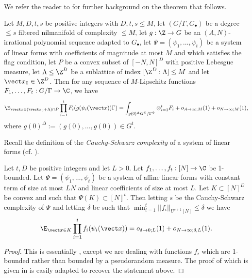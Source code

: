 We refer the reader to \cite{GT10} for further background on the theorem that follows. 

\begin{thm}\label{t:cl}
Let $M, D, t, s$ be positive integers with $D,t,s \leq M$, let $(G/\Gamma, G_\bullet)$ be a degree $\leq s$ filtered nilmanifold of complexity $\leq M$,  let $g: \Z \to G$ be an $(A,N)$-irrational polynomial sequence adapted to $G_\bullet$, let $\Psi = (\psi_1,\ldots, \psi_t)$ be a system of linear forms  with coefficients of magnitude at most $M$ and which satisfies the flag condition, let $P$ be a convex subset of $[-N,N]^D$ with positive Lebesgue measure, let $\Lambda \leq \Z^D$ be a sublattice of index $[\Z^D:\Lambda]\leq M$ and let $\vect x_0 \in \Z^D$. Then for any sequence of $M$-Lipschitz functions $F_1,\ldots,F_t: G/\Gamma \to \C$, we have 
\[\E_{\vect x \in (\vect x_0 + \Lambda )\cap P} \prod_{i=1}^t F_i(g(\psi_i(\vect x))\Gamma) =  \int_{g(0)^\Delta G^\Psi/\Gamma^\Psi}\otimes_{i=1}^t F_i + o_{A\to \infty;M}(1) + o_{N \to \infty;M}(1),\]
where $g(0)^\Delta:= (g(0),\ldots, g(0)) \in G^t$.
\end{thm}

Recall the definition of the \textit{Cauchy-Schwarz complexity} of a system of linear forms (cf. \cite[Definition 1.3.2]{T12}). 

\begin{thm}\label{t:gvN}
Let $t,D$ be positive integers and let $L>0$. Let $f_1, \ldots, f_t:[N] \to \C$ be 1-bounded. Let $\Psi = (\psi_1, \ldots, \psi_t)$ be a system of affine-linear forms with constant term of size at most $LN$ and linear coefficients of size at most $L$. Let $K \subset [N]^D$ be convex and such that $\Psi(K) \subset [N]^t$. Then letting $s$ be the Cauchy-Schwarz complexity of $\Psi$ and letting $\delta$ be such that $\min_{i=1}^t||f_i||_{U^{s+1}[N]} \leq \delta$ we have
\[ \E_{\vect x \in K} \prod_{i=1}^t f_i(\psi_i(\vect x)) = o_{\delta \to 0;L}(1) + o_{N \to \infty;\delta,L}(1).\] 
\end{thm}
\begin{proof} This is essentially \cite[Proposition 7.1]{GT10L}, except we are dealing with functions $f_i$ which are 1-bounded rather than bounded by a pseudorandom measure. The proof of  \cite[Proposition 7.1]{GT10L} which is given in  \cite[Appendix C]{GT10L} is easily adapted to recover the statement above.
\end{proof}



